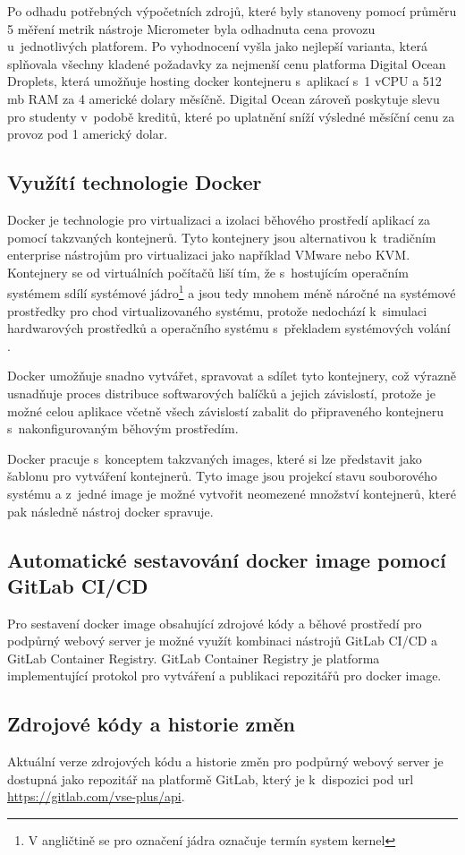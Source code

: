 Po odhadu potřebných výpočetních zdrojů, které byly stanoveny pomocí průměru 5 měření metrik nástroje Micrometer byla odhadnuta cena provozu u~jednotlivých platforem. Po vyhodnocení vyšla jako nejlepší varianta, která splňovala všechny kladené požadavky za nejmenší cenu platforma Digital Ocean Droplets, která umožňuje hosting docker kontejneru s~aplikací s~1 vCPU a 512 mb RAM za 4 americké dolary měsíčně. Digital Ocean zároveň poskytuje slevu pro studenty v~podobě kreditů, které po uplatnění sníží výsledné měsíční cenu za provoz pod 1 americký dolar.  


\subsection{Využítí technologie Docker}\label{sec:docker}

Docker je technologie pro virtualizaci a izolaci běhového prostředí aplikací za pomocí takzvaných kontejnerů. Tyto kontejnery jsou alternativou k~tradičním enterprise nástrojům pro virtualizaci jako například VMware nebo KVM. Kontejnery se od virtuálních počítačů liší tím, že s~hostujícím operačním systémem sdílí systémové jádro\footnote{V angličtině se pro označení jádra označuje termín system kernel} a jsou tedy mnohem méně náročné na systémové prostředky pro chod virtualizovaného systému, protože nedochází k~simulaci hardwarových prostředků a operačního systému s~překladem systémových volání \cite[kap. 1]{kane_docker_2018}.

Docker umožňuje snadno vytvářet, spravovat a sdílet tyto kontejnery, což výrazně usnadňuje proces distribuce softwarových balíčků a jejich závislostí, protože je možné celou aplikace včetně všech závislostí zabalit do připraveného kontejneru s~nakonfigurovaným běhovým prostředím. 

Docker pracuje s~konceptem takzvaných images, které si lze představit jako šablonu pro vytváření kontejnerů. Tyto image jsou projekcí stavu souborového systému a z~jedné image je možné vytvořit neomezené množství kontejnerů, které pak následně nástroj docker spravuje. 

\subsection{Automatické sestavování docker image pomocí GitLab CI/CD}

Pro sestavení docker image obsahující zdrojové kódy a běhové prostředí pro podpůrný webový server je možné využít kombinaci nástrojů GitLab CI/CD a GitLab Container Registry. GitLab Container Registry je platforma implementující protokol pro vytváření a publikaci repozitářů pro docker image.

\subsection{Zdrojové kódy a historie změn}

Aktuální verze zdrojových kódu a historie změn pro podpůrný webový server je dostupná jako repozitář na platformě GitLab, který je k~dispozici pod url \url{https://gitlab.com/vse-plus/api}.